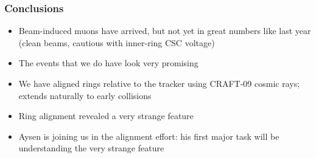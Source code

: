 \documentclass[compress]{beamer}
\begin{document}
\begin{frame}
\frametitle{Conclusions}
\begin{itemize}\setlength{\itemsep}{0.5 cm}
\item Beam-induced muons have arrived, but not yet in great numbers like last year (clean beams, cautious with inner-ring CSC voltage)

\item The events that we do have look very promising

\item We have aligned rings relative to the tracker using CRAFT-09 cosmic rays; extends naturally to early collisions

\item Ring alignment revealed a very strange feature

\item Aysen is joining us in the alignment effort: his first major task will be understanding the very strange feature

\end{itemize}
\label{numpages}
\end{frame}
\end{document}
